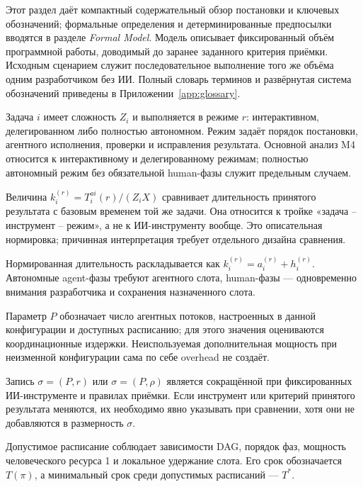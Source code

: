 Этот раздел даёт компактный содержательный обзор постановки и ключевых
обозначений; формальные определения и детерминированные предпосылки вводятся в
разделе \emph{Formal Model}. Модель описывает фиксированный объём программной работы, доводимый до
заранее заданного критерия приёмки. Исходным сценарием служит последовательное
выполнение того же объёма одним разработчиком без ИИ. Полный словарь терминов
и развёрнутая система обозначений приведены в
Приложении~\ref{app:glossary}.

\begin{description}[style=nextline]
  \item[Задача и режим.] Задача $i$ имеет сложность $Z_i$ и выполняется в
  режиме $r$: интерактивном, делегированном либо полностью автономном. Режим
  задаёт порядок постановки, агентного исполнения, проверки и исправления
  результата. Основной анализ M4 относится к интерактивному и делегированному
  режимам; полностью автономный режим без обязательной human-фазы служит
  предельным случаем.

  \item[Нормированная длительность с ИИ.] Величина
  $k_i^{(r)}=T_i^{ai}(r)/(Z_iX)$ сравнивает длительность принятого результата
  с базовым временем той же задачи. Она относится к тройке «задача --
  инструмент -- режим», а не к ИИ-инструменту вообще. Это описательная
  нормировка; причинная интерпретация требует отдельного дизайна сравнения.

  \item[Фазы.] Нормированная длительность раскладывается как
  $k_i^{(r)}=a_i^{(r)}+h_i^{(r)}$. Автономные agent-фазы требуют агентного
  слота, human-фазы --- одновременно внимания разработчика и сохранения
  назначенного слота.

  \item[Управляемый параллелизм.] Параметр $P$ обозначает число агентных
  потоков, настроенных в данной конфигурации и доступных расписанию; для этого
  значения оцениваются координационные издержки. Неиспользуемая дополнительная
  мощность при неизменной конфигурации сама по себе overhead не создаёт.

  \item[Конфигурация.] Запись $\sigma=(P,r)$ или $\sigma=(P,\rho)$ является
  сокращённой при фиксированных ИИ-инструменте и правилах приёмки. Если
  инструмент или критерий принятого результата меняются, их необходимо явно
  указывать при сравнении, хотя они не добавляются в размерность $\sigma$.

  \item[Расписание и срок.] Допустимое расписание соблюдает зависимости DAG,
  порядок фаз, мощность человеческого ресурса 1 и локальное удержание слота.
  Его срок обозначается $T(\pi)$, а минимальный срок среди допустимых
  расписаний --- $T^*$.
\end{description}

